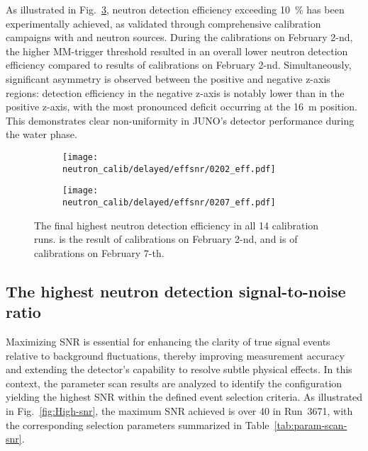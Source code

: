 As illustrated in Fig.~\ref{fig:SummaryEff}, neutron detection efficiency exceeding \SI{10}{\%} has been experimentally achieved, as validated through comprehensive calibration campaigns with  and  neutron sources. During the calibrations on February 2-nd, the higher MM-trigger threshold resulted in an overall lower neutron detection efficiency compared to results of calibrations on February 2-nd. Simultaneously, significant asymmetry is observed between the positive and negative z-axis regions: detection efficiency in the negative z-axis is notably lower than in the positive z-axis, with the most pronounced deficit occurring at the \SI{16}{m} position. This demonstrates clear non-uniformity in JUNO's detector performance during the water phase.
\begin{figure}[htbp]
	\begin{subfigure}{0.5\textwidth}
		\centering
		\texttt{[image: neutron\_calib/delayed/effsnr/0202\_eff.pdf]}
		\caption{}
		\label{fig:SummaryEff0202}
	\end{subfigure}%
	\begin{subfigure}{0.5\textwidth}
		\centering
		\texttt{[image: neutron\_calib/delayed/effsnr/0207\_eff.pdf]}
		\caption{}
		\label{fig:SummaryEff0207}
	\end{subfigure}
	\caption{The final highest neutron detection efficiency in all 14 calibration runs.  is the result of calibrations on February 2-nd, and  is of calibrations on February 7-th. }
	\label{fig:SummaryEff}
\end{figure}

\subsection{The highest neutron detection signal-to-noise ratio}
Maximizing SNR is essential for enhancing the clarity of true signal events relative to background fluctuations, thereby improving measurement accuracy and extending the detector's capability to resolve subtle physical effects. In this context, the parameter scan results are analyzed to identify the configuration yielding the highest SNR within the defined event selection criteria. As illustrated in Fig.~\ref{fig:High-snr}, the maximum SNR achieved is over 40 in Run~3671, with the corresponding selection parameters summarized in Table~\ref{tab:param-scan-snr}.

